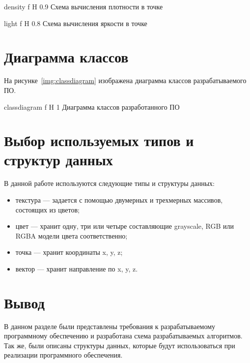{density} %
{f} %
{H} %
{0.9\textwidth} %
{Схема вычисления плотности в точке} %

{light} %
{f} %
{H} %
{0.8\textwidth} %
{Схема вычисления яркости в точке} %

\section{Диаграмма классов}

На рисунке~\ref{img:classdiagram} изображена диаграмма классов разрабатываемого ПО.

{classdiagram} %
{f} %
{H} %
{1\textwidth} %
{Диаграмма классов разработанного ПО} %


\section{Выбор используемых типов и структур данных}

В данной работе используются следующие типы и структуры данных:
\begin{itemize}
	\item текстура --- задается с помощью двумерных и трехмерных массивов, состоящих из цветов;
	\item цвет --- хранит одну, три или четыре составляющие grayscale, RGB или RGBA модели цвета соответственно;
	\item точка --- хранит координаты x, y, z;
	\item вектор --- хранит направление по x, y, z.
\end{itemize}


\section*{Вывод}
В данном разделе были представлены требования к разрабатываемому
программному обеспечению и разработана схема разрабатываемых алгоритмов.
Так же, были описаны структуры данных, которые будут использоваться при реализации программного обеспечения.

